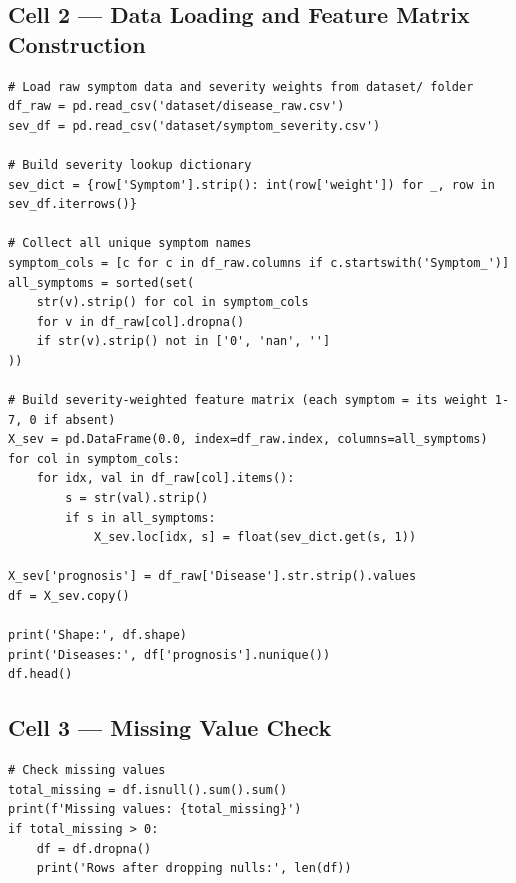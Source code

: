 \documentclass[12pt,a4paper]{article}
\begin{document}
\subsection{Cell 2 --- Data Loading and Feature Matrix Construction}

\begin{lstlisting}[caption=Cell 2: Data Loading and Severity-Weighted Feature Construction]
# Load raw symptom data and severity weights from dataset/ folder
df_raw = pd.read_csv('dataset/disease_raw.csv')
sev_df = pd.read_csv('dataset/symptom_severity.csv')

# Build severity lookup dictionary
sev_dict = {row['Symptom'].strip(): int(row['weight']) for _, row in sev_df.iterrows()}

# Collect all unique symptom names
symptom_cols = [c for c in df_raw.columns if c.startswith('Symptom_')]
all_symptoms = sorted(set(
    str(v).strip() for col in symptom_cols
    for v in df_raw[col].dropna()
    if str(v).strip() not in ['0', 'nan', '']
))

# Build severity-weighted feature matrix (each symptom = its weight 1-7, 0 if absent)
X_sev = pd.DataFrame(0.0, index=df_raw.index, columns=all_symptoms)
for col in symptom_cols:
    for idx, val in df_raw[col].items():
        s = str(val).strip()
        if s in all_symptoms:
            X_sev.loc[idx, s] = float(sev_dict.get(s, 1))

X_sev['prognosis'] = df_raw['Disease'].str.strip().values
df = X_sev.copy()

print('Shape:', df.shape)
print('Diseases:', df['prognosis'].nunique())
df.head()
\end{lstlisting}

\subsection{Cell 3 --- Missing Value Check}

\begin{lstlisting}[caption=Cell 3: Missing Value Check]
# Check missing values
total_missing = df.isnull().sum().sum()
print(f'Missing values: {total_missing}')
if total_missing > 0:
    df = df.dropna()
    print('Rows after dropping nulls:', len(df))
\end{lstlisting}
\end{document}
